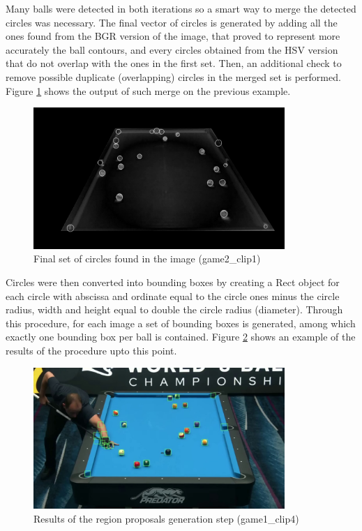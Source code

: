 Many balls were detected in both iterations so a smart way to merge the detected circles was necessary.
The final vector of circles is generated by adding all the ones found from the BGR version of the image, that proved 
to represent more accurately the ball contours, and every circles obtained from the HSV version that do not overlap with the ones
in the first set. Then, an additional check to remove possible duplicate (overlapping) circles in the merged set is performed.
Figure \ref{fig:circles_final} shows the output of such merge on the previous example. 
\begin{figure}[h!]
    \centering
    \includegraphics[width=0.85\textwidth]{imgs/ball_localization/circles_merged.jpg}
    \caption{Final set of circles found in the image (game2\_clip1)}
    \label{fig:circles_final}
\end{figure}

Circles were then converted into bounding boxes by creating a Rect object for each circle with abscissa and ordinate equal to the circle ones minus the circle radius,
width and height equal to double the circle radius (diameter).
Through this procedure, for each image a set of bounding boxes is generated, among which exactly one bounding box per ball is contained. 
Figure \ref{fig:fp_detection} shows an example of the results of the procedure upto this point.
\begin{figure}[h!]
    \centering
    \includegraphics[width=0.85\textwidth]{imgs/ball_localization/fp_detection.jpg}
    \caption{Results of the region proposals generation step (game1\_clip4)}
    \label{fig:fp_detection}
\end{figure}


